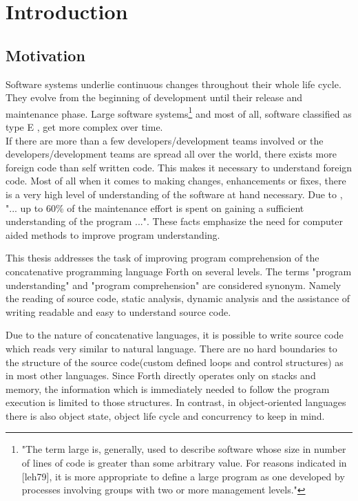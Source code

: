 \chapter{Introduction}

\section*{Motivation}

Software systems underlie continuous changes throughout their whole life cycle.
They evolve from the beginning of development until their release and maintenance phase. Large software systems\footnote{"The term large is, generally, used to describe software whose size in number of lines of code is greater than some arbitrary value. For reasons indicated in [leh79], it is more appropriate to define a large program as one developed by processes involving groups with two or more management levels."\cite{Lehman:2003:SEB:950401.950407}} and most of all, software  classified as type E \cite{Cook:2006:ESS:1115566.1115567}, get more complex over time.\\
If there are more than a few developers/development teams involved or the developers/development teams are spread all over the world, there exists more foreign code than self written code. This makes it necessary to understand foreign code.
Most of all when it comes to making changes, enhancements or fixes, there is a very high level of understanding of the software at hand necessary\cite{Boehm:1976:SE:1311958.1312684}\cite{Singer97anexamination}. Due to \cite{Cornelissen:2009:SSP:1638616.1639301}, "... up to 60\% of the maintenance effort is spent on gaining a sufficient understanding of the program ...". These facts emphasize the need for computer aided methods to improve program understanding.

This thesis addresses the task of improving program comprehension of the concatenative programming language Forth on several levels. The terms "program understanding" and "program comprehension" are considered synonym. Namely the reading of source code, static analysis, dynamic analysis and the assistance of writing readable and easy to understand source code.

Due to the nature of concatenative languages, it is possible to write source code which reads very similar to natural language. There are no hard boundaries to the structure of the source code(custom defined loops and control structures) as in most other languages. Since Forth directly operates only on stacks and memory, the information which is immediately needed to follow the program execution is limited to those structures. In contrast, in object-oriented languages there is also object state, object life cycle and concurrency to keep in mind.

